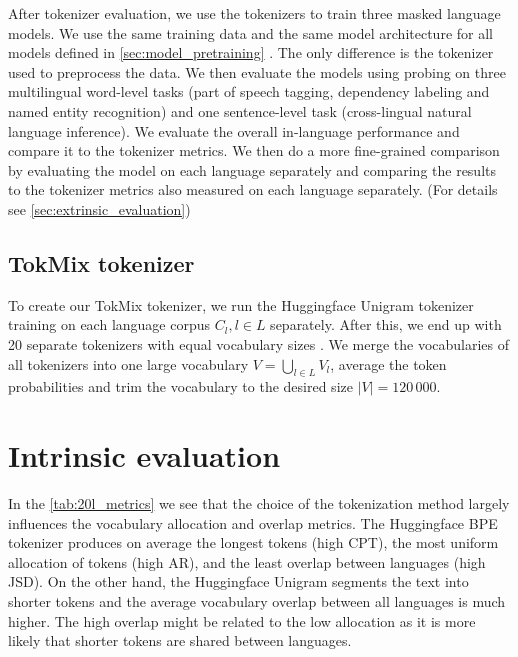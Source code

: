 After tokenizer evaluation, we use the tokenizers to train three masked language models. We use the same training data and the same model architecture for all models defined in \autoref{sec:model_pretraining} . The only difference is the tokenizer used to preprocess the data. We then evaluate the models using probing on three multilingual word-level tasks (part of speech tagging, dependency labeling and named entity recognition) and one sentence-level task (cross-lingual natural language inference). We evaluate the overall in-language performance and compare it to the tokenizer metrics. We then do a more fine-grained comparison by evaluating the model on each language separately and comparing the results to the tokenizer metrics also measured on each language separately. (For details see \autoref{sec:extrinsic_evaluation}) 





\subsection{TokMix tokenizer}

To create our TokMix tokenizer, we run the Huggingface Unigram tokenizer training on each language corpus $C_l, l \in L$ separately. After this, we end up with 20 separate tokenizers with equal vocabulary sizes . We merge the vocabularies of all tokenizers into one large vocabulary $V = \bigcup_{l \in L} V_l$, average the token probabilities and trim the vocabulary to the desired size $|V| = 120\,000$. 

\section{Intrinsic evaluation}



In the \autoref{tab:20l_metrics} we see that the choice of the tokenization method largely influences the vocabulary allocation and overlap metrics. The Huggingface BPE tokenizer produces on average the longest tokens (high CPT), the most uniform allocation of tokens (high AR), and the least overlap between languages (high JSD). On the other hand, the Huggingface Unigram segments the text into shorter tokens and the average vocabulary overlap between all languages is much higher. The high overlap might be related to the low allocation as it is more likely that shorter tokens are shared between languages. 

